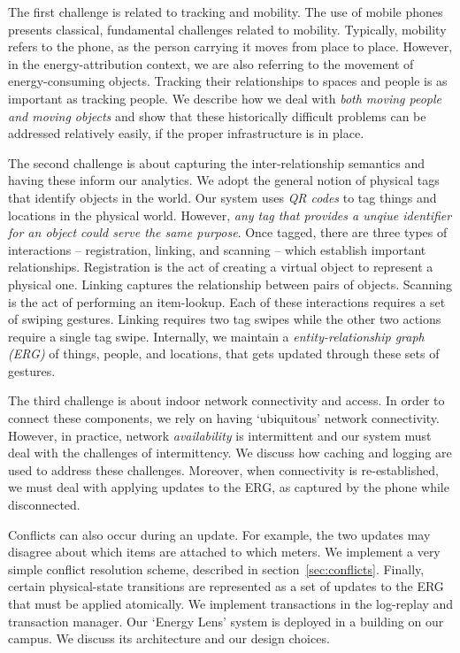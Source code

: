 The first challenge is related to tracking and mobility.
The use of mobile phones presents classical, fundamental challenges related to mobility.  Typically, mobility
refers to the phone, as the person carrying it moves from place to place.  However, in the energy-attribution
context, we are also referring to the movement of energy-consuming objects.  Tracking their relationships to spaces 
and people is as important as tracking people.  We describe how we deal with \emph{both moving people and 
moving objects} and show that these historically difficult problems can be addressed relatively easily, if the proper infrastructure is 
in place.  %

The second challenge is about capturing the inter-relationship semantics and having these inform our  analytics.
We adopt the general notion of physical tags that identify objects in the world.  Our system uses \emph{QR codes} to tag things and locations 
in the physical world.  However, \emph{any tag that provides a unqiue identifier for an object could serve the same purpose}.
Once tagged, there are three types of interactions -- 
registration, linking, and scanning -- which establish important relationships.  Registration is the act of creating a virtual object 
to represent a physical one.  Linking captures the relationship between pairs of objects.  Scanning is the act of performing an item-lookup.
Each of these interactions requires a set of swiping gestures.  Linking requires two tag swipes while the other two actions
require a single tag swipe.  Internally, we maintain a \emph{entity-relationship graph (ERG)} of things, people, and locations, that gets
updated through these sets of gestures.

The third challenge is about indoor network connectivity and access.
In order to connect these components, we rely on having `ubiquitous' network connectivity.  However, in practice, network
\emph{availability} is intermittent and our system must deal with the challenges of intermittency.  We discuss how caching
and logging are used to address these challenges.  Moreover, when connectivity is re-established, we must deal with
applying updates to the ERG, as captured by the phone while disconnected.  

Conflicts can also occur during an update.  For example, the two updates may disagree about which items are attached
to which meters.  We implement a very simple conflict resolution scheme, described in section~\ref{sec:conflicts}.
Finally, certain physical-state transitions are represented as a set of updates to the ERG that must be applied 
atomically.  We implement transactions in the log-replay and transaction manager.
Our `Energy Lens' system is deployed in a building on our campus.  We discuss
its architecture and our design choices.  
  
